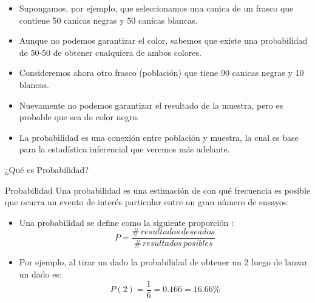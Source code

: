 \documentclass[xcolor=dvipsnames]{beamer}
\begin{document}
\begin{frame}
\begin{itemize}
\justifying
\item Supongamos, por ejemplo, que seleccionamos una canica de un frasco que contiene 50 canicas negras y 50 canicas blancas.
\item Aunque no podemos garantizar el color, sabemos que existe una probabilidad de 50-50 de obtener cualquiera de ambos colores.
\item Consideremos ahora otro frasco (población) que tiene 90 canicas negras y 10 blancas.
\item Nuevamente no podemos garantizar el resultado de la muestra, pero es probable que sea de color negro.
\item La probabilidad es una conexión entre población y muestra, la cual es base para la estadística inferencial que veremos más adelante.
\end{itemize}
\end{frame}

\begin{frame}{¿Qué es Probabilidad?}
\begin{block}{Probabilidad}
	\justifying
Una probabilidad es una estimación de con qué frecuencia es posible que ocurra un evento de interés particular entre un gran número de ensayos.
\end{block}
\begin{itemize}
\justifying
\item Una probabilidad se define como la siguiente proporción
: 
$$P=\dfrac{\#\, resultados\, deseados}{\#\, resultados\, posibles}$$
\item Por ejemplo, al tirar un dado la probabilidad de obtener un 2 luego de lanzar un dado es:
$$P(2)=\dfrac{1}{6}=0.166=16.66\%$$
\end{itemize}
\end{frame}
\end{document}
